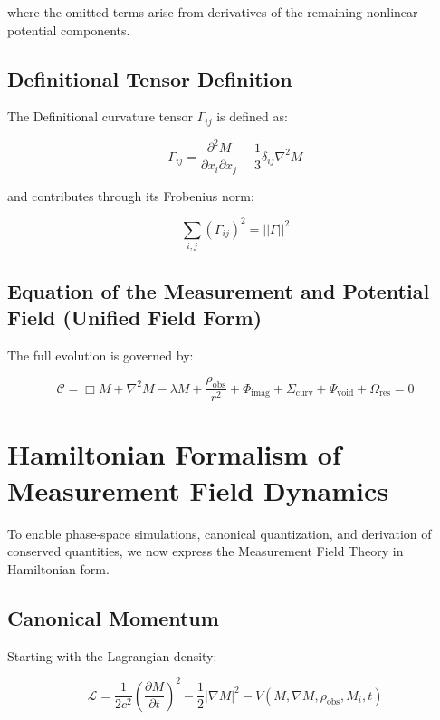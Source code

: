 where the omitted terms arise from derivatives of the remaining nonlinear potential components.

\subsection{Definitional Tensor Definition}

The Definitional curvature tensor \( \Gamma_{ij} \) is defined as:

\begin{equation}
\Gamma_{ij} = \frac{\partial^2 M}{\partial x_i \partial x_j} - \frac{1}{3} \delta_{ij} \nabla^2 M
\end{equation}

and contributes through its Frobenius norm:

\begin{equation}
\sum_{i,j} (\Gamma_{ij})^2 = ||\Gamma||^2
\end{equation}

\subsection{Equation of the Measurement and Potential Field (Unified Field Form)}

The full evolution is governed by:

\begin{equation}
\boxed{
\mathcal{C} = \Box M 
+ \nabla^2 M 
- \lambda M 
+ \frac{\rho_{\text{obs}}}{r^2} 
+ \Phi_{\text{imag}} 
+ \Sigma_{\text{curv}} 
+ \Psi_{\text{void}} 
+ \Omega_{\text{res}} 
= 0
}
\end{equation}


\section{Hamiltonian Formalism of Measurement Field Dynamics}

To enable phase-space simulations, canonical quantization, and derivation of conserved quantities, we now express the Measurement Field Theory in Hamiltonian form.

\subsection{Canonical Momentum}

Starting with the Lagrangian density:

\begin{equation}
\mathcal{L} = \frac{1}{2c^2} \left( \frac{\partial M}{\partial t} \right)^2 - \frac{1}{2} |\nabla M|^2 - V(M, \nabla M, \rho_{\text{obs}}, M_i, t)
\end{equation}

